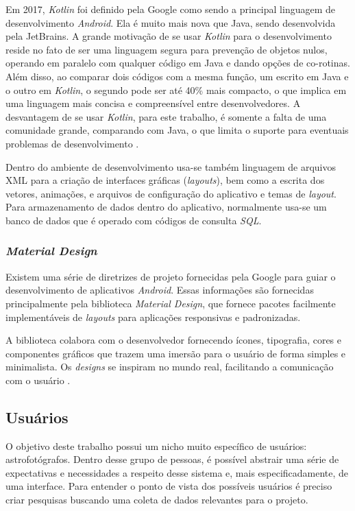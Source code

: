 Em 2017, \textit{Kotlin} foi definido pela Google como sendo a principal linguagem de desenvolvimento \textit{Android}. Ela é muito mais nova que Java, sendo desenvolvida pela JetBrains. A grande motivação de se usar \textit{Kotlin} para o desenvolvimento reside no fato de ser uma linguagem segura para prevenção de objetos nulos, operando em paralelo com qualquer código em Java e dando opções de co-rotinas. Além disso, ao comparar dois códigos com a mesma função, um escrito em Java e o outro em \textit{Kotlin}, o segundo pode ser até 40\% mais compacto, o que implica em uma linguagem mais concisa e compreensível entre desenvolvedores. A desvantagem de se usar \textit{Kotlin}, para este trabalho, é somente a falta de uma comunidade grande, comparando com Java, o que limita o suporte para eventuais problemas de desenvolvimento \cite{site:kotlinxjava}.

Dentro do ambiente de desenvolvimento usa-se também linguagem de arquivos XML para a criação de interfaces gráficas (\textit{layouts}), bem como a escrita dos vetores, animações, e arquivos de configuração do aplicativo e temas de \textit{layout}. Para armazenamento de dados dentro do aplicativo, normalmente usa-se um banco de dados que é operado com códigos de consulta \textit{SQL}.

\subsubsection{\textit{Material Design}}
Existem uma série de diretrizes de projeto fornecidas pela Google para guiar o desenvolvimento de aplicativos \textit{Android}. Essas informações são fornecidas principalmente pela biblioteca \textit{Material Design}, que fornece pacotes facilmente implementáveis de \textit{layouts} para aplicações responsivas e padronizadas.

A biblioteca colabora com o desenvolvedor fornecendo ícones, tipografia, cores e componentes gráficos que trazem uma imersão para o usuário de forma simples e minimalista. Os \textit{designs} se inspiram no mundo real, facilitando a comunicação com o usuário \cite{site:materialdesign}.

\subsection{Usuários}

O objetivo deste trabalho possui um nicho muito específico de usuários: astrofotógrafos. Dentro desse grupo de pessoas, é possível abstrair uma série de expectativas e necessidades a respeito desse sistema e, mais especificadamente, de uma interface. Para entender o ponto de vista dos possíveis usuários é preciso criar pesquisas buscando uma coleta de dados relevantes para o projeto. 

